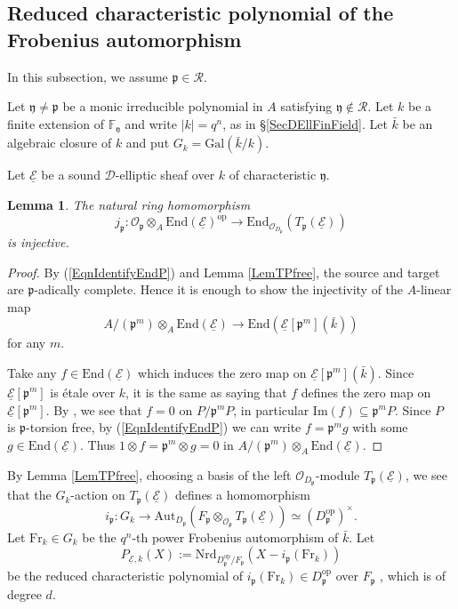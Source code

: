 \documentclass[10pt]{amsart}
\theoremstyle{plain}
\newtheorem{lem}[thm]{Lemma}
\theoremstyle{definition}
\newcommand{\Aut}{\mathrm{Aut}}
\newcommand{\End}{\mathrm{End}}
\newcommand{\Fr}{\mathrm{Fr}}
\newcommand{\Gal}{\mathrm{Gal}}
\newcommand{\Img}{\mathrm{Im}}
\newcommand{\Nrd}{\mathrm{Nrd}}
\newcommand{\opp}{\mathrm{op}}
\newcommand{\cO}{\mathcal{O}}
\newcommand{\cR}{\mathcal{R}}
\newcommand{\ucE}{\underline{\mathcal{E}}}
\newcommand{\bF}{\mathbb{F}}
\newcommand{\sD}{\mathscr{D}}
\newcommand{\frp}{\mathfrak{p}}
\newcommand{\fry}{\mathfrak{y}}
\begin{document}
\subsection{Reduced characteristic polynomial of the Frobenius automorphism}\label{SubsecRCP}
In this subsection, we assume $\frp\in \cR$.

Let $\fry\neq \frp$ be a monic irreducible polynomial in $A$ satisfying $\fry\notin \cR$. 
Let $k$ be a finite extension of $\bF_\fry$ and write $|k|=q^n$, as in \S\ref{SecDEllFinField}.
Let $\bar{k}$ be an algebraic closure of $k$ and put $G_k=\Gal(\bar{k}/k)$.

Let $\ucE$ be a sound $\sD$-elliptic sheaf over $k$ of characteristic $\fry$.

\begin{lem}\label{LemTateInj}
	The natural ring homomorphism
	\[
	j_\frp: \cO_\frp\otimes_A\End(\ucE)^\opp \to \End_{\cO_{D_\frp}}(T_\frp(\ucE))
	\]
	is injective.
\end{lem}
\begin{proof}
	By (\ref{EqnIdentifyEndP}) and Lemma \ref{LemTPfree}, the source and target are $\frp$-adically complete.
	Hence it is enough to show the injectivity of the $A$-linear map
	\[
	A/(\frp^m)\otimes_A \End(\ucE)\to \End(\ucE[\frp^m](\bar{k}))
	\]
	for any $m$.
	
	Take any $f\in \End(\ucE)$ which induces the zero map on $\ucE[\frp^m](\bar{k})$. 
	Since $\ucE[\frp^m]$ is \'{e}tale over $k$, it is the same as saying that $f$ defines the zero map on $\ucE[\frp^m]$.
	By \cite[Proposition 2.1 (5)]{Dri_F}, we see that $f=0$ on $P/\frp^m P$, in particular $\Img(f)\subseteq \frp^m P$.
	Since $P$ is $\frp$-torsion free, by (\ref{EqnIdentifyEndP}) we can write $f=\frp^m g$ with some $g\in \End(\ucE)$.
	Thus $1\otimes f=\frp^m\otimes g=0$ in $A/(\frp^m)\otimes_A \End(\ucE)$.
\end{proof}




By Lemma \ref{LemTPfree}, choosing a basis of the left $\cO_{D_\frp}$-module $T_\frp(\ucE)$,
we see that the $G_k$-action on $T_\frp(\ucE)$ defines a homomorphism
\[
i_\frp:G_k\to \Aut_{D_\frp}(F_\frp\otimes_{\cO_\frp}T_\frp(\ucE))\simeq (D_\frp^\opp)^\times.
\]
Let $\Fr_k\in G_k$ be the $q^n$-th power Frobenius automorphism of $\bar{k}$.
Let
\[
P_{\ucE,k}(X):=\Nrd_{D_\frp^\opp/F_\frp}(X-i_\frp(\Fr_k))
\]
be the reduced characteristic polynomial of $i_\frp(\Fr_k)\in D_\frp^\opp$ over $F_\frp$
\cite[(9.2)]{Rei}, which is of degree $d$.
\end{document}
